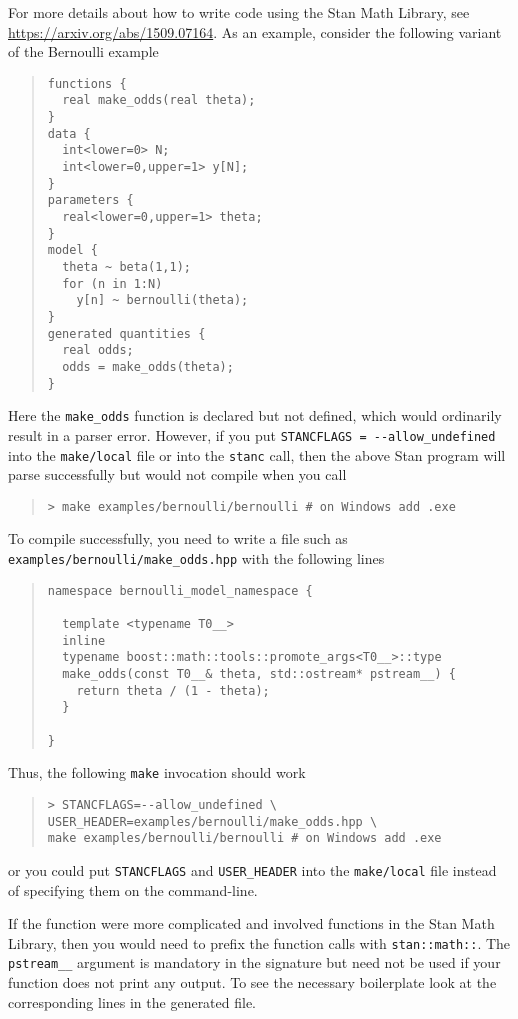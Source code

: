 For more details about how to write \Cpp code using the Stan Math
Library, see \url{https://arxiv.org/abs/1509.07164}. As an example,
consider the following variant of the Bernoulli example
%
\begin{quote}
\begin{Verbatim}
functions {
  real make_odds(real theta);
}
data {
  int<lower=0> N;
  int<lower=0,upper=1> y[N];
}
parameters {
  real<lower=0,upper=1> theta;
}
model {
  theta ~ beta(1,1);
  for (n in 1:N)
    y[n] ~ bernoulli(theta);
}
generated quantities {
  real odds;
  odds = make_odds(theta);
}
\end{Verbatim}
\end{quote}
%
Here the {\tt make\_odds} function is declared but not defined,
which would ordinarily result in a parser error. However, if you
put \Verb|STANCFLAGS = --allow_undefined| into the
{\tt make/local} file or into the {\tt stanc} call, then the above 
Stan program will parse successfully but would not compile when you 
call
%
\begin{quote}
\begin{Verbatim}[fontshape=sl]
> make examples/bernoulli/bernoulli # on Windows add .exe 
\end{Verbatim}
\end{quote}
%
To compile successfully, you need to write a file such as {\tt
examples/bernoulli/make\_odds.hpp} with the following lines
%
\begin{quote}
\begin{Verbatim}
namespace bernoulli_model_namespace {

  template <typename T0__>
  inline
  typename boost::math::tools::promote_args<T0__>::type
  make_odds(const T0__& theta, std::ostream* pstream__) {
    return theta / (1 - theta);
  }

}
\end{Verbatim}
\end{quote}
%
Thus, the following {\tt make} invocation should work
%
\begin{quote}
\begin{Verbatim}[fontshape=sl]
> STANCFLAGS=--allow_undefined \
USER_HEADER=examples/bernoulli/make_odds.hpp \
make examples/bernoulli/bernoulli # on Windows add .exe 
\end{Verbatim}
\end{quote}
%
or you could put \Verb|STANCFLAGS| and \Verb|USER_HEADER|
into the {\tt make/local} file instead of specifying them
on the command-line.

If the function were more complicated and involved functions
in the Stan Math Library, then you would need to prefix the
function calls with {\tt stan::math::}. The {\tt pstream\_\_}
argument is mandatory in the signature but need not be used
if your function does not print any output. To see the 
necessary boilerplate look at the corresponding lines in the
generated \Cpp file.
